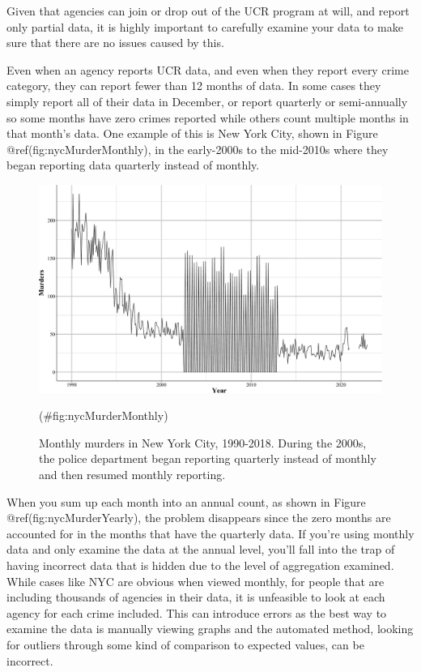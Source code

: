 \documentclass[
  12pt,
  openany]{book}
\begin{document}
Given that agencies can join or drop out of the UCR program at will, and report only partial data, it is highly important to carefully examine your data to make sure that there are no issues caused by this.

Even when an agency reports UCR data, and even when they report every crime category, they can report fewer than 12 months of data. In some cases they simply report all of their data in December, or report quarterly or semi-annually so some months have zero crimes reported while others count multiple months in that month's data. One example of this is New York City, shown in Figure @ref(fig:nycMurderMonthly), in the early-2000s to the mid-2010s where they began reporting data quarterly instead of monthly.

\begin{figure}

{\centering \includegraphics[width=0.9\linewidth]{ucrbook_files/figure-latex/nycMurderMonthly-1} 

}

\caption{Monthly murders in New York City, 1990-2018. During the 2000s, the police department began reporting quarterly instead of monthly and then resumed monthly reporting.}(\#fig:nycMurderMonthly)
\end{figure}

When you sum up each month into an annual count, as shown in Figure @ref(fig:nycMurderYearly), the problem disappears since the zero months are accounted for in the months that have the quarterly data. If you're using monthly data and only examine the data at the annual level, you'll fall into the trap of having incorrect data that is hidden due to the level of aggregation examined. While cases like NYC are obvious when viewed monthly, for people that are including thousands of agencies in their data, it is unfeasible to look at each agency for each crime included. This can introduce errors as the best way to examine the data is manually viewing graphs and the automated method, looking for outliers through some kind of comparison to expected values, can be incorrect.
\end{document}

